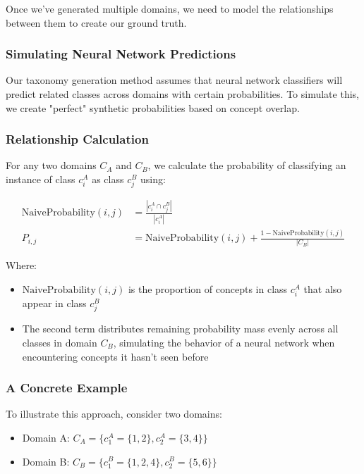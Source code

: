 Once we've generated multiple domains, we need to model the relationships between them to create our ground truth.

\subsubsection{Simulating Neural Network Predictions}

Our taxonomy generation method assumes that neural network classifiers will predict related classes across domains with certain probabilities. To simulate this, we create "perfect" synthetic probabilities based on concept overlap.

\subsubsection{Relationship Calculation}

For any two domains $C_A$ and $C_B$, we calculate the probability of classifying an instance of class $c^A_i$ as class $c^B_j$ using:

\begin{equation}
      \begin{aligned}
            \text{NaiveProbability}(i, j) & = \frac{|c^A_i \cap c^B_j|}{|c^A_i|}                                              \\
            P_{i,j}                       & = \text{NaiveProbability}(i, j) + \frac{1 - \text{NaiveProbability}(i, j)}{|C_B|}
      \end{aligned}
\end{equation}

Where:
\begin{itemize}
      \item $\text{NaiveProbability}(i, j)$ is the proportion of concepts in class $c_i^A$ that also appear in class $c_j^B$
      \item The second term distributes remaining probability mass evenly across all classes in domain $C_B$, simulating the behavior of a neural network when encountering concepts it hasn't seen before
\end{itemize}

\subsubsection{A Concrete Example}

To illustrate this approach, consider two domains:
\begin{itemize}
      \item Domain A: $C_A = \{c^A_1=\{1,2\}, c^A_2=\{3,4\}\}$
      \item Domain B: $C_B = \{c^B_1=\{1,2,4\}, c^B_2=\{5,6\}\}$
\end{itemize}

